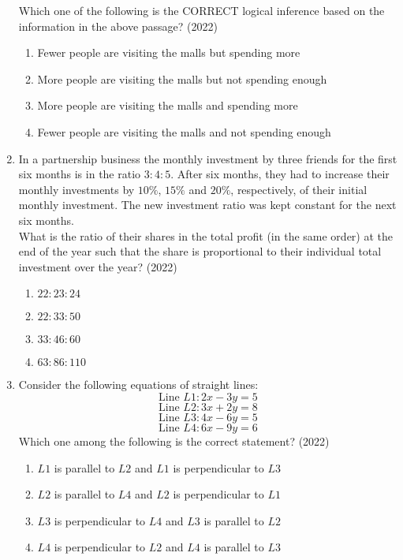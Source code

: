 \documentclass[journal]{IEEEtran}
\begin{document}
\begin{enumerate}
Which one of the following is the CORRECT logical inference based on the
information in the above passage? \hfill(2022)
\begin{enumerate}
\item  Fewer people are visiting the malls but spending more
\item More people are visiting the malls but not spending enough
\item More people are visiting the malls and spending more
\item Fewer people are visiting the malls and not spending enough
\end{enumerate}


\item In a partnership business the monthly investment by three friends for the first
six months is in the ratio $3:4:5$. After six months, they had to increase their
monthly investments by $10\%$, $15\%$ and $20\%$, respectively, of their initial
monthly investment. The new investment ratio was kept constant for the next
six months.\\

What is the ratio of their shares in the total profit (in the same order) at the end
of the year such that the share is proportional to their individual total investment
over the year? \hfill(2022)
\begin{multicols}{2}
\begin{enumerate}
\item $22:23:24$
\item $22:33:50$
\item $33:46:60$
\item $63:86:110$
\end{enumerate}
\end{multicols}


\item Consider the following equations of straight lines:
$$\text{Line }L1:2x-3y=5$$
$$\text{Line }L2:3x+2y=8$$
$$\text{Line }L3:4x-6y=5$$
$$\text{Line }L4:6x-9y=6$$
Which one among the following is the correct statement? \hfill(2022)
\begin{enumerate}
\item $L1$ is parallel to $L2$ and $L1$ is perpendicular to $L3$
\item $L2$ is parallel to $L4$ and $L2$ is perpendicular to $L1$
\item $L3$ is perpendicular to $L4$ and $L3$ is parallel to $L2$
\item $L4$ is perpendicular to $L2$ and $L4$ is parallel to $L3$
\end{enumerate}



\end{enumerate}
\end{document}
